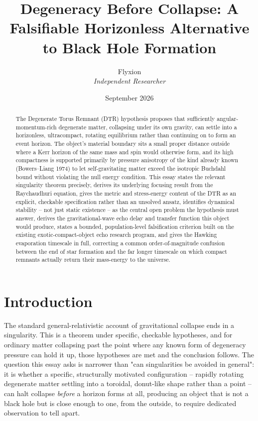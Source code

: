 \documentclass[11pt]{article}
\title{\textbf{Degeneracy Before Collapse: A Falsifiable Horizonless Alternative to Black Hole Formation}}
\author{Flyxion \\ \textit{Independent Researcher}}
\date{September 2026}
\begin{document}
\maketitle

\begin{abstract}
The Degenerate Torus Remnant (DTR) hypothesis proposes that sufficiently angular-momentum-rich degenerate matter, collapsing under its own gravity, can settle into a horizonless, ultracompact, rotating equilibrium rather than continuing on to form an event horizon. The object's material boundary sits a small proper distance outside where a Kerr horizon of the same mass and spin would otherwise form, and its high compactness is supported primarily by pressure anisotropy of the kind already known (Bowers--Liang 1974) to let self-gravitating matter exceed the isotropic Buchdahl bound without violating the null energy condition. This essay states the relevant singularity theorem precisely, derives its underlying focusing result from the Raychaudhuri equation, gives the metric and stress-energy content of the DTR as an explicit, checkable specification rather than an unsolved ansatz, identifies dynamical stability -- not just static existence -- as the central open problem the hypothesis must answer, derives the gravitational-wave echo delay and transfer function this object would produce, states a bounded, population-level falsification criterion built on the existing exotic-compact-object echo research program, and gives the Hawking evaporation timescale in full, correcting a common order-of-magnitude confusion between the end of star formation and the far longer timescale on which compact remnants actually return their mass-energy to the universe.
\end{abstract}

\tableofcontents

\section{Introduction}

The standard general-relativistic account of gravitational collapse ends in a singularity. This is a theorem under specific, checkable hypotheses, and for ordinary matter collapsing past the point where any known form of degeneracy pressure can hold it up, those hypotheses are met and the conclusion follows. The question this essay asks is narrower than "can singularities be avoided in general": it is whether a specific, structurally motivated configuration -- rapidly rotating degenerate matter settling into a toroidal, donut-like shape rather than a point -- can halt collapse \emph{before} a horizon forms at all, producing an object that is not a black hole but is close enough to one, from the outside, to require dedicated observation to tell apart.
\end{document}
